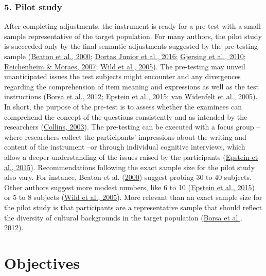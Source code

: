 \documentclass[
  ,doc,11pt, twoside,floatsintext]{apa6}
\begin{document}
\hypertarget{pilot-study}{%
\subsubsection{5. Pilot study}\label{pilot-study}}

After completing adjustments, the instrument is ready for a pre-test with a small sample representative of the target population. For many authors, the pilot study is succeeded only by the final semantic adjustments suggested by the pre-testing sample (\protect\hyperlink{ref-beaton2000}{Beaton et al., 2000}; \protect\hyperlink{ref-dortasjunior2016}{Dortas Junior et al., 2016}; \protect\hyperlink{ref-gjersing2010}{Gjersing et al., 2010}; \protect\hyperlink{ref-reichenheim2007}{Reichenheim \& Moraes, 2007}; \protect\hyperlink{ref-wild2005}{Wild et al., 2005}). The pre-testing may unveil unanticipated issues the test subjects might encounter and any divergences regarding the comprehension of item meaning and expressions as well as the test instructions (\protect\hyperlink{ref-borsaAdaptacaoValidacaoInstrumentos2012}{Borsa et al., 2012}; \protect\hyperlink{ref-epstein2015}{Epstein et al., 2015}; \protect\hyperlink{ref-vanwidenfelt2005}{van Widenfelt et al., 2005}). In short, the purpose of the pre-test is to assess whether the examinees can comprehend the concept of the questions consistently and as intended by the researchers (\protect\hyperlink{ref-collins2003}{Collins, 2003}). The pre-testing can be executed with a focus group -- where researchers collect the participants' impressions about the writing and content of the instrument --or through individual cognitive interviews, which allow a deeper understanding of the issues raised by the participants (\protect\hyperlink{ref-epstein2015}{Epstein et al., 2015}). Recommendations following the exact sample size for the pilot study also vary. For instance, Beaton et al. (\protect\hyperlink{ref-beaton2000}{2000}) suggest probing 30 to 40 subjects. Other authors suggest more modest numbers, like 6 to 10 (\protect\hyperlink{ref-epstein2015}{Epstein et al., 2015}) or 5 to 8 subjects (\protect\hyperlink{ref-wild2005}{Wild et al., 2005}). More relevant than an exact sample size for the pilot study is that participants are a representative sample that should reflect the diversity of cultural backgrounds in the target population (\protect\hyperlink{ref-borsaAdaptacaoValidacaoInstrumentos2012}{Borsa et al., 2012}).

\hypertarget{objectives}{%
\section{Objectives}\label{objectives}}
\end{document}
